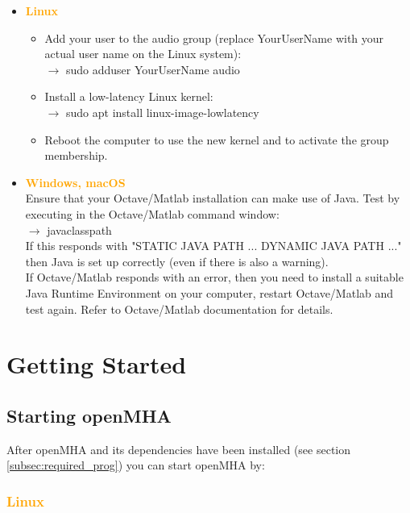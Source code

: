 \documentclass[11pt,a4paper,twoside]{article}
\newcommand{\+}{\discretionary{\mbox{\scriptsize$\hookleftarrow$}}{}{}}
\begin{document}
\begin{itemize}
\item \textcolor{orange}{\textbf{Linux}}
  \begin{itemize}
  \item Add your user to the {\ttfamily audio} group (replace {\ttfamily
    YourUserName} with your actual user name on the Linux system): \\
    $\rightarrow$ {\ttfamily sudo adduser YourUserName audio}
  \item Install a low-latency Linux kernel: \\
    $\rightarrow$ {\ttfamily sudo apt install linux-image-lowlatency}
  \item Reboot the computer to use the new kernel and to activate the group
    membership.
  \end{itemize}
\item \textcolor{orange}{\textbf{Windows, macOS}} \\
  Ensure that your Octave/Matlab installation can make use of Java.
  Test by executing in the Octave/Matlab command window: \\
  $\rightarrow$ {\ttfamily javaclasspath} \\
  If this responds with "STATIC JAVA PATH ... DYNAMIC JAVA PATH ..." then
  Java is set up correctly (even if there is also a warning).
  \\ If Octave/Matlab responds with an error, then you need to install a
  suitable Java Runtime Environment on your computer, restart Octave/Matlab
  and test again. Refer to Octave/Matlab documentation for details.
\end{itemize}

\section{Getting Started}

\subsection{Starting openMHA}
\label{starting_openmha}
    
After openMHA and its dependencies have been installed
(see section \ref{subsec:required_prog}) you can start openMHA by: 

\subsubsection*{\textcolor{orange}{\textbf{Linux}}}
\end{document}
